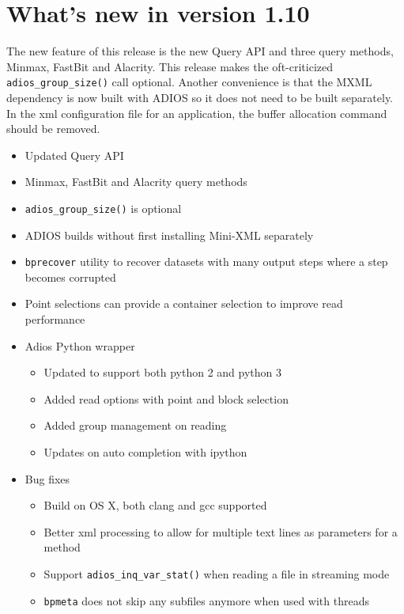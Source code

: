 %
%

\section {What's new in version 1.10}
The new feature of this release is the new Query API and three query methods, Minmax, FastBit and Alacrity. This release makes the oft-criticized \verb+adios_group_size()+ call optional. Another convenience is that the MXML dependency is now built with ADIOS so it does not need to be built separately. In the xml configuration file for an application, the buffer allocation command should be removed. 

\begin{itemize}
\item Updated Query API
\item Minmax, FastBit and Alacrity query methods
\item \verb+adios_group_size()+ is optional
\item ADIOS builds without first installing Mini-XML separately
\item \verb+bprecover+ utility to recover datasets with many output steps where a step becomes corrupted
\item Point selections can provide a container selection to improve read performance
\item Adios Python wrapper
    \begin{itemize}
    \item Updated to support both python 2 and python 3
    \item Added read options with point and block selection
    \item Added group management on reading
    \item Updates on auto completion with ipython
    \end{itemize}

\item Bug fixes
    \begin{itemize}
    \item Build on OS X, both clang and gcc supported
    \item Better xml processing to allow for multiple text lines as parameters for a method
    \item Support \verb+adios_inq_var_stat()+ when reading a file in streaming mode
    \item \verb+bpmeta+ does not skip any subfiles anymore when used with threads
    \end{itemize}
\end{itemize}


